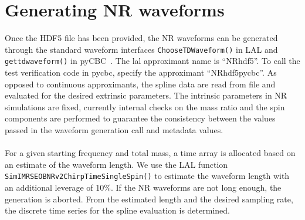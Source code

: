 \documentclass[aps,prd,amssymb,amsmath,amsfonts,superscriptaddress,
floatfix ,preprintnumbers,altaffilletter]{revtex4}
\begin{document}
\section{Generating NR waveforms}
\label{sec:gen}
Once the HDF5 file has been provided, the NR waveforms can be generated through the standard waveform interfaces \texttt{ChooseTDWaveform()} in LAL
and \texttt{get\textunderscore td\textunderscore waveform()} in pyCBC~\cite{Canton:2014ena}. The lal approximant name is ``NR\textunderscore hdf5''. To call the test verification code in pycbc, specify the approximant ``NR\textunderscore hdf5\textunderscore pycbc''. 
As opposed to continuous approximants, the spline data are read from file and evaluated for the desired extrinsic
parameters. The intrinsic parameters in NR simulations are fixed, currently internal checks on the mass ratio and the spin components 
are performed to guarantee the consistency between the values passed
in the waveform generation call and metadata values. \\
\\For a given starting frequency and total mass, a time array is allocated based on an estimate of the waveform length. We use the LAL function 
\texttt{SimIMRSEOBNRv2ChirpTimeSingleSpin()} to estimate the waveform length with an additional leverage of 10\%. If the NR waveforms are not long
enough, the generation is aborted. From the estimated length and the desired sampling rate, the discrete time series for the spline evaluation is
determined.
\end{document}
